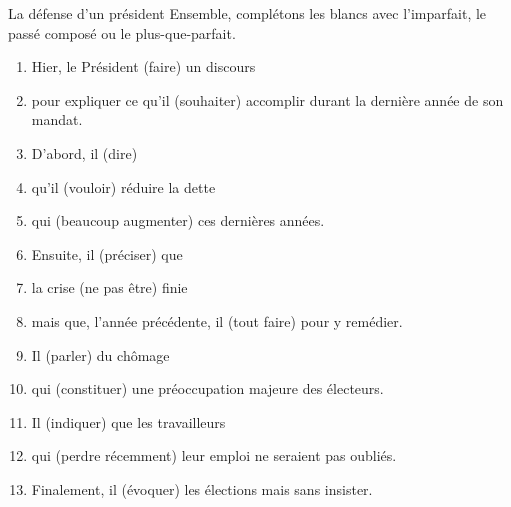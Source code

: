 \begin{frame}{La défense d'un président}
  \scriptsize
  Ensemble, complétons les blancs avec l'\alert{imparfait}, le \alert{passé composé} ou le \alert{plus-que-parfait}.
  \begin{enumerate}
    \item Hier, le Président \underline{} (faire) un discours
    \item pour expliquer ce qu'il \underline{} (souhaiter) accomplir durant la dernière année de son mandat.
    \item D'abord, il \underline{} (dire)
    \item qu'il \underline{} (vouloir) réduire la dette
    \item qui \underline{} (beaucoup augmenter) ces dernières années.
    \item Ensuite, il \underline{} (préciser) que
    \item la crise \underline{} (ne pas être) finie
    \item mais que, l'année précédente, il \underline{} (tout faire) pour y remédier.
    \item Il \underline{} (parler) du chômage
    \item qui \underline{} (constituer) une préoccupation majeure des électeurs.
    \item Il \underline{} (indiquer) que les travailleurs
    \item qui \underline{} (perdre récemment) leur emploi ne seraient pas oubliés.
    \item Finalement, il \underline{} (évoquer) les élections mais sans insister.
  \end{enumerate}
\end{frame}